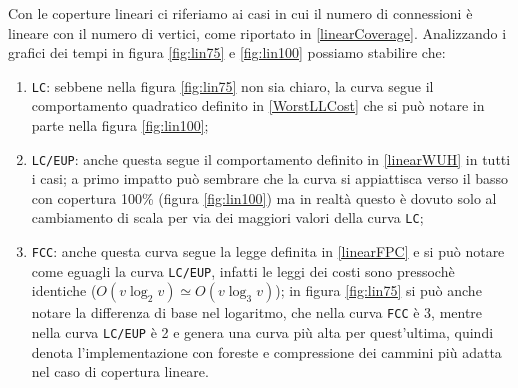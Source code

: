 Con le coperture lineari ci riferiamo ai casi in cui il numero di connessioni è lineare con il numero di vertici, come riportato in \eqref{linearCoverage}.
Analizzando i grafici dei tempi in figura \ref{fig:lin75} e \ref{fig:lin100} possiamo stabilire che:
\begin{enumerate}
    \item \texttt{LC}: sebbene nella figura \ref{fig:lin75} non sia chiaro, la curva segue il comportamento quadratico definito in \eqref{WorstLLCost}
          che si può notare in parte nella figura \ref{fig:lin100};
    \item \texttt{LC/EUP}: anche questa segue il comportamento definito in \eqref{linearWUH} in tutti i casi; a primo impatto può sembrare
          che la curva si appiattisca verso il basso con copertura 100\% (figura \ref{fig:lin100}) ma in realtà questo è dovuto solo al
          cambiamento di scala per via dei maggiori valori della curva \texttt{LC};
    \item \texttt{FCC}: anche questa curva segue la legge definita in \eqref{linearFPC} e si può notare come
          eguagli la curva \texttt{LC/EUP}, infatti le leggi dei costi sono pressochè identiche ($O(v\log_2v) \simeq O(v\log_3v)$); in figura
          \ref{fig:lin75} si può anche notare la differenza di base nel logaritmo, che nella curva \texttt{FCC} è 3, mentre nella curva
          \texttt{LC/EUP} è 2 e genera una curva più alta per quest'ultima, quindi denota l'implementazione con foreste e compressione
          dei cammini più adatta nel caso di copertura lineare.
\end{enumerate}

